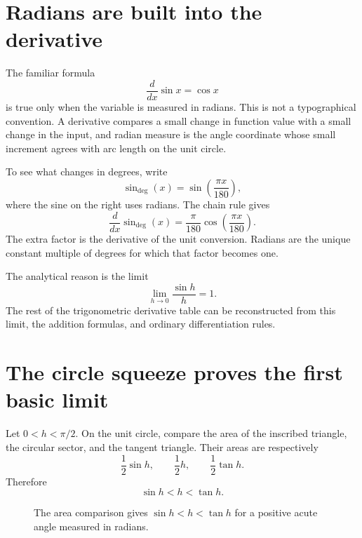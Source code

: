 
\section{Radians are built into the derivative}

The familiar formula
\[
  \frac{d}{dx}\sin x=\cos x
\]
is true only when the variable is measured in radians.  This is not a typographical convention.  A derivative compares a small change in function value with a small change in the input, and radian measure is the angle coordinate whose small increment agrees with arc length on the unit circle.

To see what changes in degrees, write
\[
  \sin_{\deg}(x)=\sin\left(\frac{\pi x}{180}\right),
\]
where the sine on the right uses radians.  The chain rule gives
\[
  \frac{d}{dx}\sin_{\deg}(x)
  =\frac{\pi}{180}
   \cos\left(\frac{\pi x}{180}\right).
\]
The extra factor is the derivative of the unit conversion.  Radians are the unique constant multiple of degrees for which that factor becomes one.

The analytical reason is the limit
\[
  \lim_{h\to0}\frac{\sin h}{h}=1.
\]
The rest of the trigonometric derivative table can be reconstructed from this limit, the addition formulas, and ordinary differentiation rules.

\section{The circle squeeze proves the first basic limit}

Let \(0<h<\pi/2\).  On the unit circle, compare the area of the inscribed triangle, the circular sector, and the tangent triangle.  Their areas are respectively
\[
  \frac12\sin h,
  \qquad
  \frac12h,
  \qquad
  \frac12\tan h.
\]
Therefore
\[
  \sin h<h<\tan h.
\]

\begin{figure}[H]
\centering
{}
\caption{The area comparison gives \(\sin h<h<\tan h\) for a positive acute angle measured in radians.}
\end{figure}

